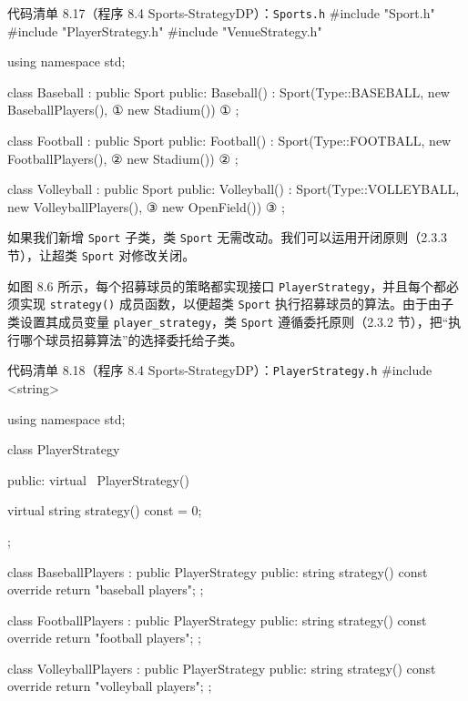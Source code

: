\begin{codeboxt}{代码清单 8.17（程序 8.4 Sports-StrategyDP）：\texttt{Sports.h}}
#include "Sport.h"
#include "PlayerStrategy.h"
#include "VenueStrategy.h"

using namespace std;

class Baseball : public Sport
{
public:
    Baseball() : Sport(Type::BASEBALL,
                       new BaseballPlayers(),    ①
                       new Stadium()) {}         ①
};

class Football : public Sport
{
public:
    Football() : Sport(Type::FOOTBALL,
                       new FootballPlayers(),     ②
                       new Stadium()) {}          ②
};

class Volleyball : public Sport
{
public:
    Volleyball() : Sport(Type::VOLLEYBALL,
                         new VolleyballPlayers(), ③
                         new OpenField()) {}      ③
};
\end{codeboxt}
\par
{}\par
{}\par

如果我们新增 \texttt{Sport} 子类，类 \texttt{Sport} 无需改动。我们可以运用开闭原则（2.3.3 节），让超类 \texttt{Sport} 对修改关闭。

如图 8.6 所示，每个招募球员的策略都实现接口 \texttt{Player\allowbreak{}Strategy}，并且每个都必须实现 \texttt{strategy(\allowbreak{})\allowbreak{}} 成员函数，以便超类 \texttt{Sport} 执行招募球员的算法。由于由子类设置其成员变量 \texttt{player\_\allowbreak{}strategy}，类 \texttt{Sport} 遵循委托原则（2.3.2 节），把“执行哪个球员招募算法”的选择委托给子类。

\begin{codeboxt}{代码清单 8.18（程序 8.4 Sports-StrategyDP）：\texttt{Player\allowbreak{}Strategy.\allowbreak{}h}}
#include <string>

using namespace std;

class PlayerStrategy
{
public:
    virtual ~PlayerStrategy() {}

    virtual string strategy() const = 0;
};

class BaseballPlayers : public PlayerStrategy
{
public:
    string strategy() const override
    {
        return "baseball players";
    }
};

class FootballPlayers : public PlayerStrategy
{
public:
    string strategy() const override
    {
        return "football players";
    }
};

class VolleyballPlayers : public PlayerStrategy
{
public:
    string strategy() const override
    {
        return "volleyball players";
    }
};
\end{codeboxt}


